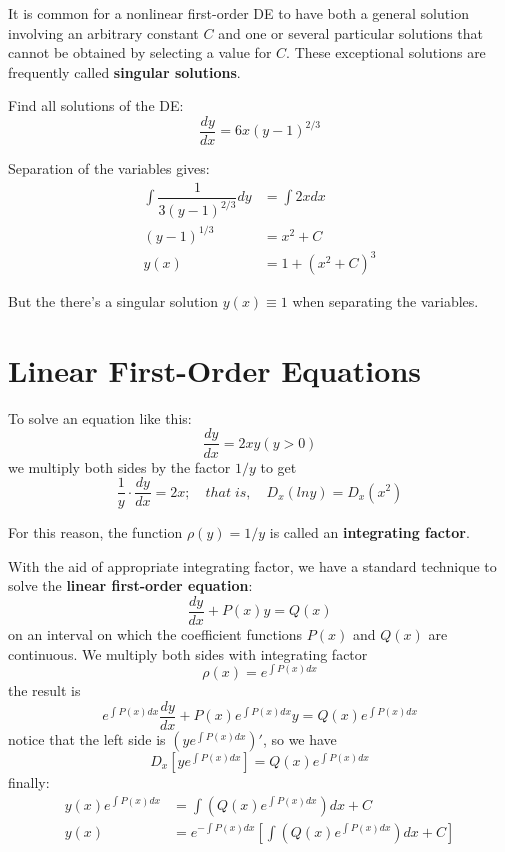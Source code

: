 \begin{definition}
    It is common for a nonlinear first-order DE to have both a general solution involving an arbitrary constant \(C\) and one or several particular solutions that cannot be obtained by selecting a value for \(C\).  
    These exceptional solutions are frequently called \textbf{singular solutions}. 
\end{definition}

\begin{example}
    Find all solutions of the DE:
    \[
        \dfrac{dy}{dx} = 6x(y-1)^{2/3}
    \]

    Separation of the variables gives:
    \begin{align*}
        \int \dfrac{1}{3(y-1)^{2/3}} dy &= \int 2x dx \\
        (y-1)^{1/3} &= x^2 +C \\
        y(x) &= 1 + (x^2 + C)^3 \tag{general solutions}
    \end{align*}

    But the there's a singular solution \(y(x) \equiv 1\) when separating the variables. 
\end{example}

\section{Linear First-Order Equations}

\begin{example}
    To solve an equation like this:
    \[
        \dfrac{dy}{dx} = 2xy (y > 0)
    \]
    we multiply both sides by the factor \(1/y\) to get
    \[
        \dfrac{1}{y} \cdot \dfrac{dy}{dx} = 2x; 
        \quad
        that\;is,
        \quad 
        D_x(ln y) = D_x(x^2)
    \]  

    For this reason, the function \(\rho(y) = 1/y\) is called an \textbf{integrating factor}.
\end{example}

With the aid of appropriate integrating factor, we have a standard technique to solve the \textbf{linear first-order equation}:
\[
    \dfrac{dy}{dx} + P(x) y = Q(x) 
\]
on an interval on which the coefficient functions \(P(x)\) and \(Q(x)\) are continuous.   
We multiply both sides with integrating factor 
\[
    \rho(x) =  e^{\int P(x)dx}    
\]
the result is
\[
    e^{\int P(x)dx} \dfrac{dy}{dx} + P(x) e^{\int P(x)dx} y = Q(x) e^{\int P(x)dx}
\]
notice that the left side is \((y e^{\int P(x)dx})'\), so we have
\[
    D_x[y e^{\int P(x)dx}] = Q(x) e^{\int P(x) dx} 
\] 
finally:
\begin{align*}
    y(x) e^{\int P(x)dx} &= \int (Q(x) e^{\int P(x) dx})dx + C\\
    y(x)  &= e^{-\int P(x)dx}[\int (Q(x) e^{\int P(x) dx})dx + C]
\end{align*}

